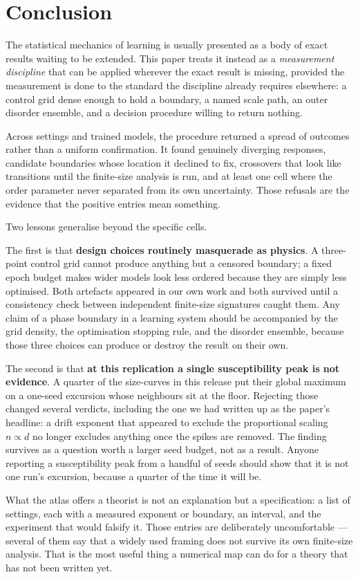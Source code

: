 \section{Conclusion}
\label{sec:conclusion}

The statistical mechanics of learning is usually presented as a body of exact
results waiting to be extended. This paper treats it instead as a
\emph{measurement discipline} that can be applied wherever the exact result is
missing, provided the measurement is done to the standard the discipline
already requires elsewhere: a control grid dense enough to hold a boundary, a
named scale path, an outer disorder ensemble, and a decision procedure willing
to return nothing.

Across \AtlasTotalFamilies{} settings and \AtlasTotalRuns{} trained models, the
procedure returned a spread of outcomes rather than a uniform confirmation. It
found genuinely diverging responses, candidate boundaries whose location it
declined to fix, crossovers that look like transitions until the finite-size
analysis is run, and at least one cell where the order parameter never
separated from its own uncertainty. Those refusals are the evidence that the
positive entries mean something.

Two lessons generalise beyond the specific cells.

The first is that \textbf{design choices routinely masquerade as physics}. A
three-point control grid cannot produce anything but a censored boundary; a
fixed epoch budget makes wider models look less ordered because they are simply
less optimised. Both artefacts appeared in our own work and both survived until
a consistency check between independent finite-size signatures caught them.
Any claim of a phase boundary in a learning system should be accompanied by the
grid density, the optimisation stopping rule, and the disorder ensemble, because
those three choices can produce or destroy the result on their own.

The second is that \textbf{at this replication a single susceptibility peak is
not evidence}. A quarter of the size-curves in this release put their global
maximum on a one-seed excursion whose neighbours sit at the floor. Rejecting
those changed several verdicts, including the one we had written up as the
paper's headline: a drift exponent that appeared to exclude the proportional
scaling $n\propto d$ no longer excludes anything once the spikes are removed.
The finding survives as a question worth a larger seed budget, not as a result.
Anyone reporting a susceptibility peak from a handful of seeds should show that
it is not one run's excursion, because a quarter of the time it will be.

What the atlas offers a theorist is not an explanation but a specification: a
list of settings, each with a measured exponent or boundary, an interval, and
the experiment that would falsify it. Those entries are deliberately
uncomfortable --- several of them say that a widely used framing does not
survive its own finite-size analysis. That is the most useful thing a numerical
map can do for a theory that has not been written yet.
